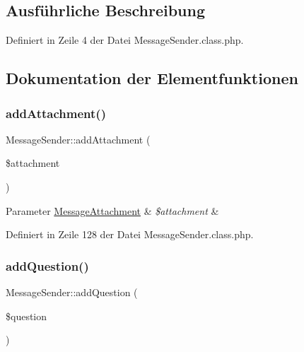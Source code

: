 \subsection{Ausführliche Beschreibung}


Definiert in Zeile 4 der Datei Message\+Sender.\+class.\+php.



\subsection{Dokumentation der Elementfunktionen}
\mbox{\label{class_message_sender_a97fe86bda23bda7295fcaa9025be1ba9}} 
\subsubsection{\texorpdfstring{add\+Attachment()}{addAttachment()}}
{\footnotesize\ttfamily Message\+Sender\+::add\+Attachment (\begin{DoxyParamCaption}\item[{}]{\$attachment }\end{DoxyParamCaption})}


\begin{DoxyParams}[1]{Parameter}
\mbox{\hyperlink{class_message_attachment}{Message\+Attachment}} & {\em \$attachment} & \\
\hline
\end{DoxyParams}


Definiert in Zeile 128 der Datei Message\+Sender.\+class.\+php.

\mbox{\label{class_message_sender_a53226a6ca85406bf39751d9296bc622e}} 
\subsubsection{\texorpdfstring{add\+Question()}{addQuestion()}}
{\footnotesize\ttfamily Message\+Sender\+::add\+Question (\begin{DoxyParamCaption}\item[{}]{\$question }\end{DoxyParamCaption})}


